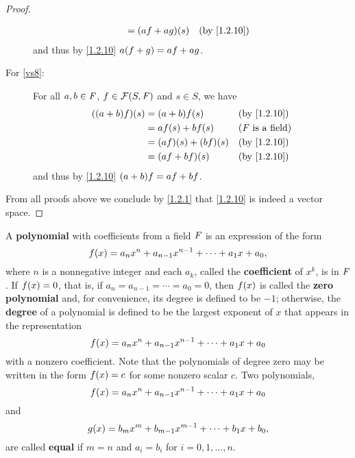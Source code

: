 \begin{proof}
\begin{description}
\begin{align*}
				                     & = \p{af + ag}\p{s}          &  & \text{(by \cref{1.2.10})}
			\end{align*}
			and thus by \cref{1.2.10} \(a \p{f + g} = af + ag\).
		\item[For \ref{vs8}:]
			For all \(a, b \in \mathit{F}\), \(f \in \FS\) and \(s \in S\), we have
			\begin{align*}
				\p{\p{a + b} f}\p{s} & = \p{a + b} f\p{s}          &  & \text{(by \cref{1.2.10})}  \\
				                     & = af\p{s} + bf\p{s}         &  & \text{(\(\F\) is a field)} \\
				                     & = \p{af}\p{s} + \p{bf}\p{s} &  & \text{(by \cref{1.2.10})}  \\
				                     & = \p{af + bf}\p{s}          &  & \text{(by \cref{1.2.10})}
			\end{align*}
			and thus by \cref{1.2.10} \(\p{a + b} f = af + bf\).
	\end{description}
	From all proofs above we conclude by \cref{1.2.1} that \cref{1.2.10} is indeed a vector space.
\end{proof}

\begin{defn}\label{1.2.11}
	A \textbf{polynomial} with coefficients from a field \(\mathit{F}\) is an expression of the form
	\[
		f\p{x} = a_{n} x^{n} + a_{n - 1} x^{n - 1} + \cdots + a_{1} x + a_{0},
	\]
	where \(n\) is a nonnegative integer and each \(a_{k}\), called the \textbf{coefficient} of \(x^{k}\), is in \(\mathit{F}\).
	If \(f\p{x} = 0\), that is, if \(a_{n} = a_{n - 1} = \cdots = a_{0} = 0\), then \(f\p{x}\) is called the \textbf{zero polynomial} and, for convenience, its degree is defined to be \(-1\);
	otherwise, the \textbf{degree} of a polynomial is defined to be the largest exponent of \(x\) that appears in the representation
	\[
		f\p{x} = a_{n} x^{n} + a_{n - 1} x^{n - 1} + \cdots + a_{1} x + a_{0}
	\]
	with a nonzero coefficient.
	Note that the polynomials of degree zero may be written in the form \(f\p{x} = c\) for some nonzero scalar \(c\).
	Two polynomials,
	\[
		f\p{x} = a_{n} x^{n} + a_{n - 1} x^{n - 1} + \cdots + a_{1} x + a_{0}
	\]
	and
	\[
		g\p{x} = b_{m} x^{m} + b_{m - 1} x^{m - 1} + \cdots + b_{1} x + b_{0},
	\]
	are called \textbf{equal} if \(m = n\) and \(a_i = b_i\) for \(i = 0, 1, \dots, n\).
\end{defn}

